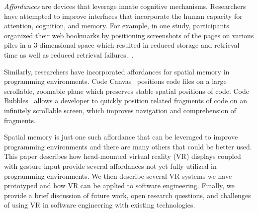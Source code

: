\documentclass[conference]{IEEEtran}
\begin{document}
\emph{Affordances} are devices that leverage innate cognitive mechanisms.
Researchers have attempted to improve interfaces that incorporate the human capacity for attention, cognition, and memory.
For example, in one study, participants organized their web bookmarks by positioning screenshots of the pages on various piles in a 3-dimensional space which resulted in reduced storage and retrieval time as well as reduced retrieval failures.~\cite{Robertson:1998}. 


Similarly, researchers have incorporated affordances for spatial memory in programming environments.  Code Canvas~\cite{DeLine:CodeCanvas} positions code files on a large scrollable, zoomable plane which preserves stable spatial positions of code.  Code Bubbles~\cite{Bragdon:CodeBubbles} allows a developer to quickly position related fragments of code on an infinitely scrollable screen, which improves navigation and comprehension of fragments.  



Spatial memory is just one such affordance that can be leveraged to improve programming environments and there are many others that could be better used. 
This paper describes how head-mounted virtual reality (VR) displays coupled with gesture input provide several affordances not yet fully utilized in programming environments.
We then describe several VR systems we have prototyped and how VR can be applied to software engineering.  Finally, we provide a brief discussion of future work, open research questions, and challenges of using VR in software engineering with existing technologies.


\end{document}
